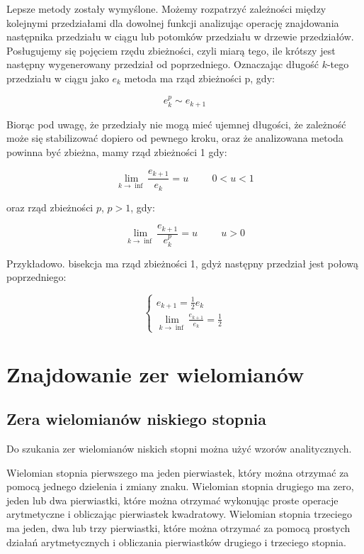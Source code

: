 \documentclass[11pt,a4paper,oneside]{report}
\begin{document}
Lepsze metody zostały wymyślone. Możemy rozpatrzyć zależności między kolejnymi przedziałami dla dowolnej funkcji analizując operację znajdowania następnika przedziału w ciągu lub potomków przedziału w drzewie przedziałów. Posługujemy się pojęciem rzędu zbieżności, czyli miarą tego, ile krótszy jest następny wygenerowany przedział od poprzedniego. Oznaczając długość $k$-tego przedziału w ciągu jako $e_k$ metoda ma rząd zbieżności p, gdy:

$$e_k^p \sim e_{k+1}$$

Biorąc pod uwagę, że przedziały nie mogą mieć ujemnej długości, że zależność może się stabilizować dopiero od pewnego kroku, oraz że analizowana metoda powinna być zbieżna, mamy rząd zbieżności 1 gdy:

$$\lim_{k \rightarrow \inf}\frac{e_{k+1}}{e_k} = u\hspace{1cm}0<u<1$$

oraz rząd zbieżności $p$, $p>1$, gdy:

$$\lim_{k\rightarrow\inf}\frac{e_{k+1}}{e_k^p} = u\hspace{1cm}u>0$$

Przykładowo. bisekcja ma rząd zbieżności 1, gdyż następny przedział jest połową poprzedniego:

\begin{equation}
\begin{cases}
e_{k+1}=\frac{1}{2}e_k \\
\lim_{k \rightarrow \inf}\frac{e_{k+1}}{e_k}=\frac{1}{2}
\end{cases}
\end{equation}

\section{Znajdowanie zer wielomianów}

\subsection{Zera wielomianów niskiego stopnia}

Do szukania zer wielomianów niskich stopni można użyć wzorów analitycznych. 

Wielomian stopnia pierwszego ma jeden pierwiastek, który można otrzymać za pomocą jednego dzielenia i zmiany znaku. Wielomian stopnia drugiego ma zero, jeden lub dwa pierwiastki, które można otrzymać wykonując proste operacje arytmetyczne i obliczając pierwiastek kwadratowy. Wielomian stopnia trzeciego ma jeden, dwa lub trzy pierwiastki, które można otrzymać za pomocą prostych działań arytmetycznych i obliczania pierwiastków drugiego i trzeciego stopnia.
\end{document}
